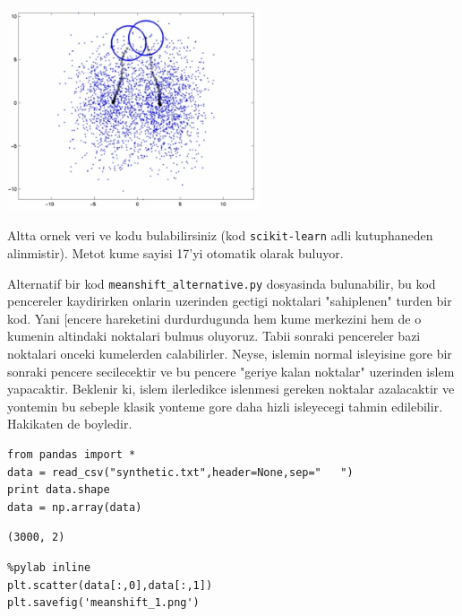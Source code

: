 \documentclass[12pt,fleqn]{article}\usepackage{../common}
\begin{document}
\includegraphics[height=6cm]{start.png}

Altta ornek veri ve kodu bulabilirsiniz (kod \verb!scikit-learn!
adli kutuphaneden alinmistir). Metot kume sayisi 17'yi otomatik olarak
buluyor.

Alternatif bir kod \verb!meanshift_alternative.py! dosyasinda
bulunabilir, bu kod pencereler kaydirirken onlarin uzerinden gectigi
noktalari "sahiplenen" turden bir kod. Yani [encere hareketini
durdurdugunda hem kume merkezini hem de o kumenin altindaki noktalari
bulmus oluyoruz.  Tabii sonraki pencereler bazi noktalari onceki
kumelerden calabilirler. Neyse, islemin normal isleyisine gore bir
sonraki pencere secilecektir ve bu pencere "geriye kalan noktalar"
uzerinden islem yapacaktir.  Beklenir ki, islem ilerledikce islenmesi
gereken noktalar azalacaktir ve yontemin bu sebeple klasik yonteme
gore daha hizli isleyecegi tahmin edilebilir. Hakikaten de boyledir.

\begin{verbatim}
from pandas import *
data = read_csv("synthetic.txt",header=None,sep="   ")
print data.shape
data = np.array(data)
\end{verbatim}

\begin{verbatim}
(3000, 2)
\end{verbatim}

\begin{verbatim}
%pylab inline
plt.scatter(data[:,0],data[:,1])
plt.savefig('meanshift_1.png')
\end{verbatim}
\end{document}
